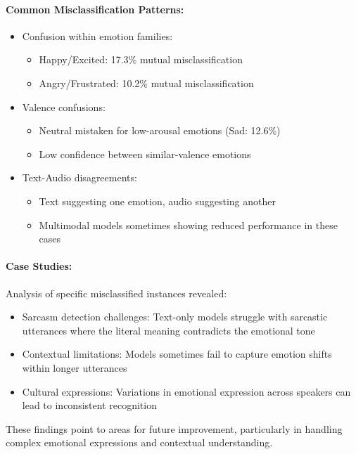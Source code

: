 \documentclass[12pt]{article}
\begin{document}
\paragraph{Common Misclassification Patterns:}
\begin{itemize}
    \item Confusion within emotion families:
    \begin{itemize}
        \item Happy/Excited: 17.3\% mutual misclassification
        \item Angry/Frustrated: 10.2\% mutual misclassification
    \end{itemize}
    
    \item Valence confusions:
    \begin{itemize}
        \item Neutral mistaken for low-arousal emotions (Sad: 12.6\%)
        \item Low confidence between similar-valence emotions
    \end{itemize}
    
    \item Text-Audio disagreements:
    \begin{itemize}
        \item Text suggesting one emotion, audio suggesting another
        \item Multimodal models sometimes showing reduced performance in these cases
    \end{itemize}
\end{itemize}

\paragraph{Case Studies:}
Analysis of specific misclassified instances revealed:
\begin{itemize}
    \item Sarcasm detection challenges: Text-only models struggle with sarcastic utterances where the literal meaning contradicts the emotional tone
    \item Contextual limitations: Models sometimes fail to capture emotion shifts within longer utterances
    \item Cultural expressions: Variations in emotional expression across speakers can lead to inconsistent recognition
\end{itemize}

These findings point to areas for future improvement, particularly in handling complex emotional expressions and contextual understanding.
\end{document}
